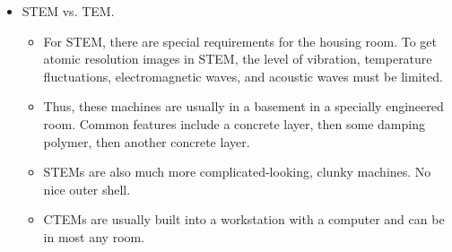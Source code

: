 \documentclass[../notes.tex]{subfiles}
\begin{document}
\begin{itemize}
\begin{itemize}
        \begin{itemize}
            \item The electron beam is focused to a fine spot (approximate size: \SIrange{0.05}{0.2}{\nano\meter}).
            \item The beam scans over the sample in a raster illumination system that is constructed so that the sample is illuminated at each point with the beam parallel to the optical axis.
        \end{itemize}
        \item STEM is great for analytical techniques such as $Z$-contrast annular dark-field imaging (which we'll talk about later), as well as spectroscopic mapping by energy dispersive X-ray (EDX) spectroscopy and/or electron energy loss spectroscopy (EELS).
        \item A typical STEM is a CTEM plus additional scanning coils and detectors. However\dots
        \begin{itemize}
            \item It can be very expensive to make these modifications, and it can't be done to every instrument.
        \end{itemize}
        \item Addition of an aberration corrector to STEMs enables electron probes to be focused to sub-\si{\angstrom} diameters.
        \begin{itemize}
            \item Images with sub-\si{\angstrom} resolution (better than \SI{1.36}{\angstrom}) can be acquired.
        \end{itemize}
    \end{itemize}
    \item STEM vs. TEM.
    \begin{itemize}
        \item For STEM, there are special requirements for the housing room. To get atomic resolution images in STEM, the level of vibration, temperature fluctuations, electromagnetic waves, and acoustic waves must be limited.
        \item Thus, these machines are usually in a basement in a specially engineered room. Common features include a concrete layer, then some damping polymer, then another concrete layer.
        \item STEMs are also much more complicated-looking, clunky machines. No nice outer shell.
        \item CTEMs are usually built into a workstation with a computer and can be in most any room.

\end{itemize}
\end{itemize}
\end{document}
